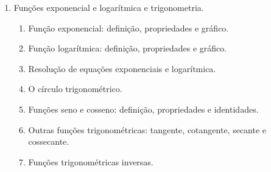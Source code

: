 \begin{small}
\begin{enumerate}
\item Funções exponencial e logarítmica e trigonometria.
\begin{enumerate}[3.1]
\item Função exponencial: definição, propriedades e gráfico.
\item Função logarítmica: definição, propriedades e gráfico.
\item Resolução de equações exponenciais e logarítmica.
\item O círculo trigonométrico.
\item Funções seno e cosseno: definição, propriedades e identidades.
\item Outras funções trigonométricas: tangente, cotangente, secante e cossecante.
\item Funções trigonométricas inversas.
\end{enumerate}
\end{enumerate}
\end{small}